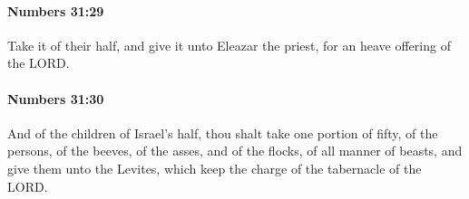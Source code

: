 		\paragraph{Numbers 31:29} %
			\label{NUMBERS-31-29}

			Take it of their half, and give it unto Eleazar the priest, for an heave offering of the LORD.


		\paragraph{Numbers 31:30} %
			\label{NUMBERS-31-30}

			And of the children of Israel’s half, thou shalt take one portion of fifty, of the persons, of the beeves, of the asses, and of the flocks, of all manner of beasts, and give them unto the Levites, which keep the charge of the tabernacle of the LORD.


